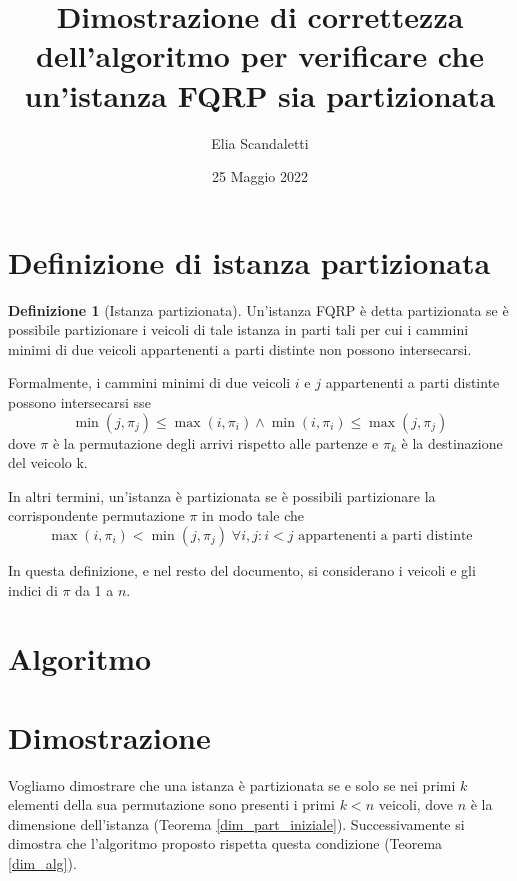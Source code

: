\documentclass{article}
\title{Dimostrazione di correttezza dell'algoritmo per verificare che un'istanza FQRP sia partizionata}
\author{Elia Scandaletti}
\date{25 Maggio 2022}
\theoremstyle{definition}
\newtheorem{definition}{Definizione}
\begin{document}
\maketitle

\tableofcontents

\clearpage

\section{Definizione di istanza partizionata}
\begin{definition}[Istanza partizionata]\label{def_part}
    Un'istanza FQRP è detta partizionata se è possibile partizionare i veicoli di tale istanza in parti tali per cui i cammini minimi di due veicoli appartenenti a parti distinte non possono intersecarsi.
\end{definition}
Formalmente, i cammini minimi di due veicoli $i$ e $j$ appartenenti a parti distinte possono intersecarsi sse
\[ \min(j, \pi_j) \leq \max(i, \pi_i) \wedge \min(i, \pi_i) \leq \max(j, \pi_j) \]
dove $\pi$ è la permutazione degli arrivi rispetto alle partenze e $\pi_k$ è la destinazione del veicolo k.

In altri termini, un'istanza è partizionata se è possibili partizionare la corrispondente permutazione $\pi$ in modo tale che
\begin{equation}
    \label{cond_part}
    \max(i, \pi_i) < \min(j, \pi_j)\;\forall i, j : i < j \mbox{ appartenenti a parti distinte}
\end{equation}

In questa definizione, e nel resto del documento, si considerano i veicoli e gli indici di $\pi$ da 1 a $n$.

\section{Algoritmo}


\section{Dimostrazione}
Vogliamo dimostrare che una istanza è partizionata se e solo se nei primi $k$ elementi della sua permutazione sono presenti i primi $k < n$ veicoli, dove $n$ è la dimensione dell'istanza (Teorema \ref{dim_part_iniziale}).
Successivamente si dimostra che l'algoritmo proposto rispetta questa condizione (Teorema \ref{dim_alg}).
\end{document}
